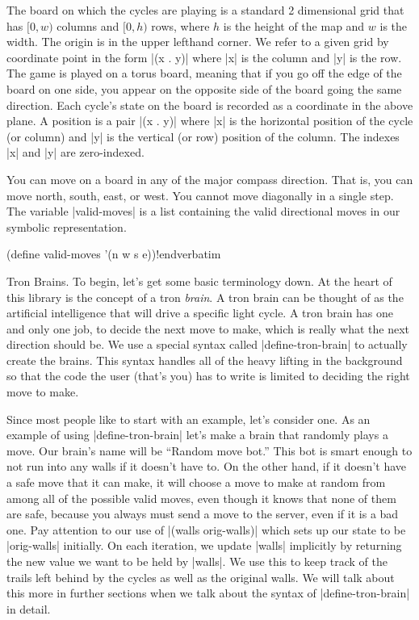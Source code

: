 \fi

 The board on which the cycles are
playing is a standard 2 dimensional grid that has $[0,w)$ columns and
$[0,h)$ rows, where $h$ is the height of the map and $w$ is the
width. The origin is in the upper lefthand corner. We refer to a given
grid by coordinate point in the form |(x . y)| where |x| is the column
and |y| is the row. The game is played on a torus board, meaning that
if you go off the edge of the board on one side, you appear on the
opposite side of the board going the same direction. Each cycle's
state on the board is recorded as a coordinate in the above plane. A
position is a pair |(x . y)| where |x| is the horizontal position of
the cycle (or column) and |y| is the vertical (or row) position of the
column. The indexes |x| and |y| are zero-indexed.
  

You can move on a board in any of the major compass direction. That is, 
you can move north, south, east, or west. You cannot move diagonally 
in a single step. The variable |valid-moves| is a list containing 
the valid directional moves in our symbolic representation.
  


\Y\B \verbatim
(define valid-moves '(n w s e))!endverbatim  \par
\fi

Tron Brains. To begin, let's get some basic terminology down. At
the heart of this library is the concept of a tron {\it brain}. A
tron brain can be thought of as the artificial intelligence that will
drive a specific light cycle. A tron brain has one and only one job,
to decide the next move to make, which is really what the next
direction should be. We use a special syntax called |define-tron-brain|
to actually create the brains. This syntax handles all of the heavy
lifting in the background so that the code the user (that's you)
has to write is limited to deciding the right move to make. 
 

Since most people like to start with an example, let's consider one.
As an example of using |define-tron-brain| let's make a brain
that randomly plays a move. Our brain's name will be ``Random move
bot.'' This bot is smart enough to not run into any walls if it doesn't
have to. On the other hand, if it doesn't have a safe move that it
can make, it will choose a move to make at random from among all of
the possible valid moves, even though it knows that none of them are
safe, because you always must send a move to the server, even if it
is a bad one.  Pay attention to our use of |(walls orig-walls)| which
sets up our state to be |orig-walls| initially. On each iteration,
we update |walls| implicitly by returning the new value we want to
be held by |walls|. We use this to keep track of the trails left
behind by the cycles as well as the original walls. We will talk
about this more in further sections when we talk about the syntax of
|define-tron-brain| in detail.


